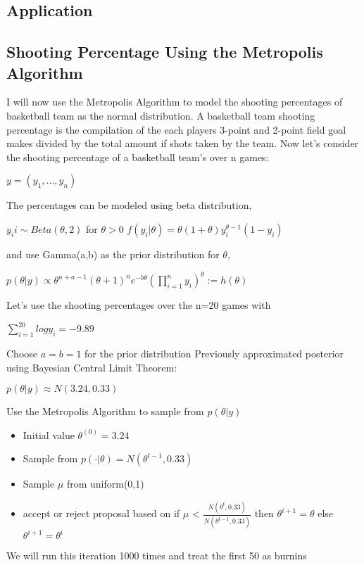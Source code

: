 \documentclass[11pt,a4paper]{article}
\theoremstyle{plain}
\begin{document}
\newpage


\subsection*{Application}

\subsection*{Shooting Percentage Using the Metropolis Algorithm}
I will now use the Metropolis Algorithm to model the shooting percentages of basketball team as the normal distribution.
A basketball team shooting percentage is the compilation of the each players 3-point and 2-point field goal makes divided by the total amount if shots taken by the team. 
\newline Now let's consider the shooting percentage of a basketball team's over n games: 
\begin{center}
$y=(y_1,...,y_n)$
\end{center}
The percentages can be modeled using beta distribution,
\begin{center}
$y_ii \sim Beta(\theta,2)$ for $\theta >0$ 
\newline $f(y_i|\theta)=\theta(1+\theta)y_i^{\theta-1}(1-y_i)$
\end{center}
and use Gamma(a,b) as the prior distribution for $\theta$,
\begin{center}
$p(\theta|y)\propto \theta^{n+a-1}(\theta + 1)^n e^{-b\theta}(\displaystyle\prod_{i=1}^n y_i)^{\theta} :=h(\theta)$
\end{center}
Let's use the shooting percentages over the n=20 games with 
\begin{center}
$\displaystyle\sum_{i=1}^{20} log y_i =-9.89$
\end{center}
Choose $a=b=1$ for the prior distribution
\newline Previously approximated posterior using Bayesian Central Limit Theorem:
\begin{center}
$p(\theta|y)\approx N(3.24,0.33) $
\end{center}
Use the Metropolis Algorithm to sample from $p(\theta|y)$ 
\begin{itemize}
  \item Initial value $\theta^{(0)}=3.24$
  \item Sample from $p(\cdot|\theta)=N(\theta^{t-1},0.33)$
  \item Sample $\mu$ from uniform(0,1)
  \item accept or reject proposal based on if $\mu$ < $\frac{N(\theta^t,0.33)}{N(\theta^{t-1},0.33)}$ then $\theta^{i+1}=\theta$
  \newline else $\theta^{i+1}=\theta^i$
\end{itemize}
We will run this iteration 1000 times and treat the first 50 as burnins 
\newpage
\end{document}
